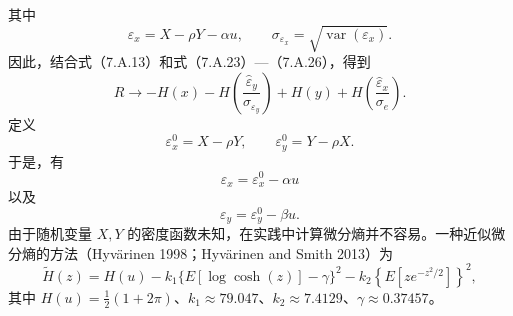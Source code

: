 其中
\[
\varepsilon_x=X-\rho Y-\alpha u,\qquad
\sigma_{\varepsilon_x}=\sqrt{\operatorname{var}(\varepsilon_x)}.
\]
因此，结合式（7.A.13）和式（7.A.23）—（7.A.26），得到
\begin{equation}
R\to-H(x)-H\left(\frac{\widehat\varepsilon_y}{\sigma_{\varepsilon_y}}\right)
 +H(y)+H\left(\frac{\widehat\varepsilon_x}{\sigma_e}\right).\tag{7.A.27}
\end{equation}
定义
\[
\varepsilon_x^0=X-\rho Y,\qquad \varepsilon_y^0=Y-\rho X.
\]
于是，有
\begin{equation}
\varepsilon_x=\varepsilon_x^0-\alpha u\tag{7.A.28}
\end{equation}
以及
\begin{equation}
\varepsilon_y=\varepsilon_y^0-\beta u.\tag{7.A.29}
\end{equation}
由于随机变量 $X,Y$ 的密度函数未知，在实践中计算微分熵并不容易。一种近似微分熵的方法（Hyvärinen 1998；Hyvärinen and Smith 2013）为
\begin{equation}
\widetilde H(z)=H(u)-k_1\{E[\log\cosh(z)]-\gamma\}^2
 -k_2\left\{E\left[ze^{-z^2/2}\right]\right\}^2,\tag{7.A.30}
\end{equation}
其中 $H(u)=\tfrac12(1+2\pi)$、$k_1\approx79.047$、$k_2\approx7.4129$、$\gamma\approx0.37457$。

